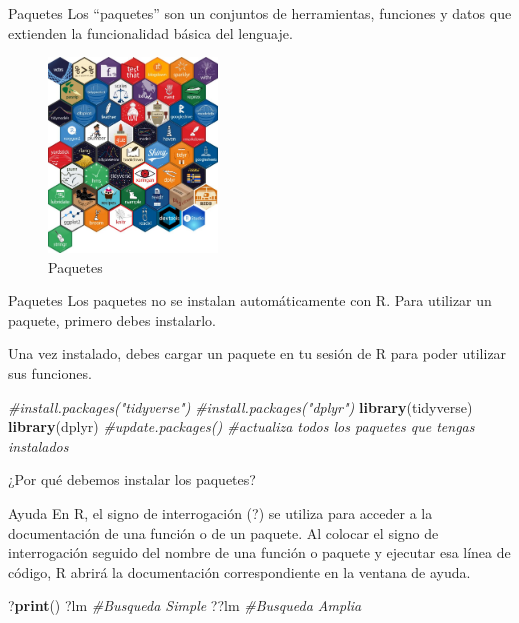 \documentclass[
  ignorenonframetext,
]{beamer}
\newenvironment{Shaded}{\begin{snugshade}}{\end{snugshade}}
\newcommand{\CommentTok}[1]{\textcolor[rgb]{0.56,0.35,0.01}{\textit{#1}}}
\newcommand{\FunctionTok}[1]{\textcolor[rgb]{0.13,0.29,0.53}{\textbf{#1}}}
\newcommand{\NormalTok}[1]{#1}
\begin{document}
\begin{frame}[fragile]{Paquetes}
\protect\hypertarget{paquetes}{}
Los ``paquetes'' son un conjuntos de herramientas, funciones y datos que
extienden la funcionalidad básica del lenguaje.

\begin{figure}
\hypertarget{id}{%
\centering
\includegraphics[width=0.4\textwidth,height=0.4\textheight]{Imagenes/Paquetes.jpeg}
\caption{Paquetes}\label{id}
}
\end{figure}

\begin{block}{Paquetes}
\protect\hypertarget{paquetes-1}{}
Los paquetes no se instalan automáticamente con R. Para utilizar un
paquete, primero debes instalarlo.

Una vez instalado, debes cargar un paquete en tu sesión de R para poder
utilizar sus funciones.

\begin{Shaded}
\begin{Highlighting}[]
\CommentTok{\#install.packages("tidyverse")}
\CommentTok{\#install.packages("dplyr")}
\FunctionTok{library}\NormalTok{(tidyverse)}
\FunctionTok{library}\NormalTok{(dplyr) }
\CommentTok{\#update.packages() \#actualiza todos los paquetes que tengas instalados}
\end{Highlighting}
\end{Shaded}
\end{block}
\end{frame}

\begin{frame}{¿Por qué debemos instalar los paquetes?}
\protect\hypertarget{por-quuxe9-debemos-instalar-los-paquetes}{}
\end{frame}

\begin{frame}[fragile]{Ayuda}
\protect\hypertarget{ayuda}{}
En R, el signo de interrogación (?) se utiliza para acceder a la
documentación de una función o de un paquete. Al colocar el signo de
interrogación seguido del nombre de una función o paquete y ejecutar esa
línea de código, R abrirá la documentación correspondiente en la ventana
de ayuda.

\begin{Shaded}
\begin{Highlighting}[]
\NormalTok{?}\FunctionTok{print}\NormalTok{()}
\NormalTok{?lm }\CommentTok{\#Busqueda Simple}
\NormalTok{??lm }\CommentTok{\#Busqueda Amplia }
\end{Highlighting}
\end{Shaded}
\end{frame}
\end{document}
